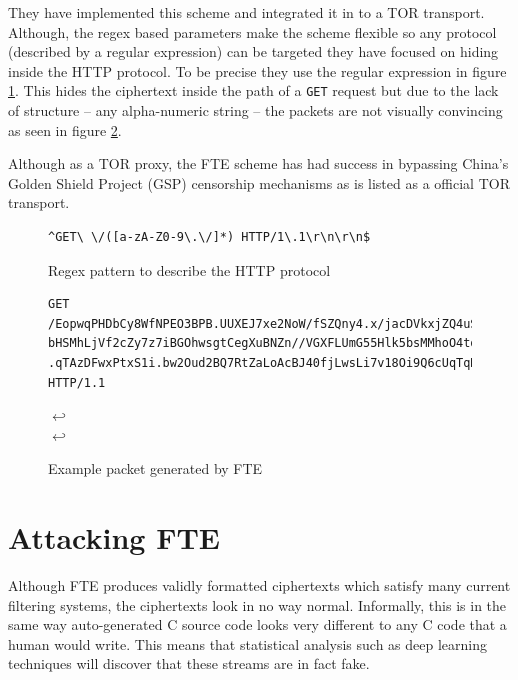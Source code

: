 \documentclass[ %
                    author={Samuel Russell},
                supervisor={Prof. Bogdan Warinschi},
                    degree={MEng},
                     title={Innocuous Ciphertexts},
                  subtitle={The DE-CENSOR Scheme},
                      type={research},
                      year={2018} ]{dissertation}
\begin{document}
They have implemented this scheme and integrated it in to a TOR transport. Although, the regex based parameters make the scheme flexible so any protocol (described by a regular expression) can be targeted they have focused on hiding inside the HTTP protocol. To be precise they use the regular expression in figure \ref{fig:http-regex}. This hides the ciphertext inside the path of a \texttt{GET} request but due to the lack of structure -- any alpha-numeric string -- the packets are not visually convincing as seen in figure \ref{fig:http-ex}.

Although as a TOR proxy, the FTE scheme has had success in bypassing China's Golden Shield Project (GSP) censorship mechanisms as is listed as a official TOR transport.

\begin{figure}[h]
\begin{verbatim}
^GET\ \/([a-zA-Z0-9\.\/]*) HTTP/1\.1\r\n\r\n$
\end{verbatim}
\caption{Regex pattern to describe the HTTP protocol}
\label{fig:http-regex}
\end{figure}


\begin{figure}[h]
\begin{verbatim}
GET /EopwqPHDbCy8WfNPEO3BPB.UUXEJ7xe2NoW/fSZQny4.x/jacDVkxjZQ4uSqgZu7.N2AGbaYeFqr/DEh
bHSMhLjVf2cZy7z7iBGOhwsgtCegXuBNZn//VGXFLUmG55Hlk5bsMMhoO4tqF.mYApGxAd2c0G/goOnZLivQB
.qTAzDFwxPtxS1i.bw2Oud2BQ7RtZaLoAcBJ40fjLwsLi7v18Oi9Q6cUqTqHKTMsVWijB9/kh HTTP/1.1
\end{verbatim}
$\hookleftarrow$\\
$\hookleftarrow$
\caption{Example packet generated by FTE}
\label{fig:http-ex}
\end{figure}




\section{Attacking FTE}\label{attacking_fte}

Although FTE produces validly formatted ciphertexts which satisfy many current filtering systems, the ciphertexts look in no way normal.
Informally, this is in the same way auto-generated C source code looks very different to any C code that a human would write.
This means that statistical analysis such as deep learning techniques will discover that these streams are in fact fake.
\end{document}
